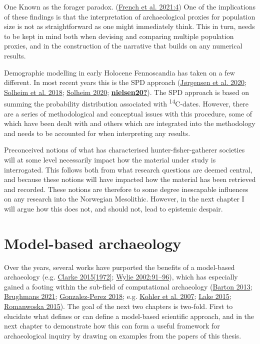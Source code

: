 \documentclass[
  a4paper,
  oneside]{uiophdthesis}
\begin{document}
One Known as the forager paradox. (\protect\hyperlink{ref-french2021}{French et al. 2021:4})
One of the implications of these findings is that the interpretation of archaeological proxies for population size is not as straightforward as one might immediately think. This in turn, needs to be kept in mind both when devising and comparing multiple population proxies, and in the construction of the narrative that builds on any numerical results.

Demographic modelling in early Holocene Fennoscandia has taken on a few different. In most recent years this is the SPD approach (\protect\hyperlink{ref-jorgensen2020}{Jørgensen et al. 2020}; \protect\hyperlink{ref-solheim2018}{Solheim et al. 2018}; \protect\hyperlink{ref-solheim2020}{Solheim 2020}; \protect\hyperlink{ref-nielsen20}{\textbf{nielsen20?}}). The SPD approach is based on summing the probability distribution associated with \textsuperscript{14}C-dates. However, there are a series of methodological and conceptual issues with this procedure, some of which have been dealt with and others which are integrated into the methodology and needs to be accounted for when interpreting any results.

Preconceived notions of what has characterised hunter-fisher-gatherer societies will at some level necessarily impact how the material under study is interrogated. This follows both from what research questions are deemed central, and because these notions will have impacted how the material has been retrieved and recorded. These notions are therefore to some degree inescapable influences on any research into the Norwegian Mesolithic. However, in the next chapter I will argue how this does not, and should not, lead to epistemic despair.

\hypertarget{model-based-archaeology-1}{%
\section{Model-based archaeology}\label{model-based-archaeology-1}}

Over the years, several works have purported the benefits of a model-based archaeology (e.g. \protect\hyperlink{ref-clarke1972}{Clarke 2015{[}1972{]}}; \protect\hyperlink{ref-wylie2002}{Wylie 2002:91--96}), which has especially gained a footing within the sub-field of computational archaeology (\protect\hyperlink{ref-barton2013}{Barton 2013}; \protect\hyperlink{ref-brughmans2021}{Brughmans 2021}; \protect\hyperlink{ref-gonzalez-perez2018}{Gonzalez-Perez 2018}; e.g. \protect\hyperlink{ref-kohler2007}{Kohler et al. 2007}; \protect\hyperlink{ref-lake2015}{Lake 2015}; \protect\hyperlink{ref-romanowska2015}{Romanwoska 2015}). The goal of the next two chapters is two-fold. First to elucidate what defines or can define a model-based scientific approach, and in the next chapter to demonstrate how this can form a useful framework for archaeological inquiry by drawing on examples from the papers of this thesis.
\end{document}
